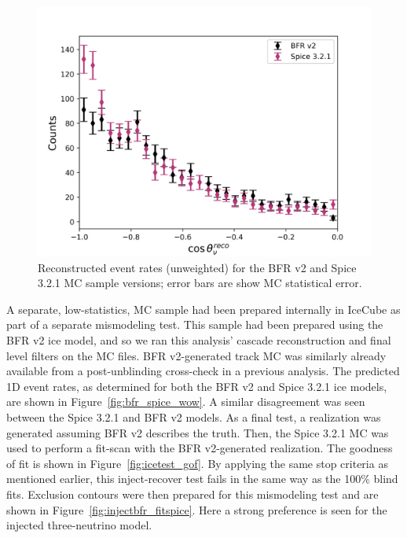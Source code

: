 \documentclass[main.tex]{subfiles}
\begin{document}
\begin{figure}
    \centering
    \includegraphics[width=0.8\linewidth]{figures/ice_investigate/icetest.png}
    \caption{Reconstructed event rates (unweighted) for the BFR v2 and Spice 3.2.1 MC sample versions; error bars are show MC statistical error.}\label{fig:icetest}
\end{figure}

A separate, low-statistics, MC sample had been prepared internally in IceCube as part of a separate mismodeling test. 
This sample had been prepared using the BFR v2 ice model, and so we ran this analysis' cascade reconstruction and final level filters on the MC files. 
BFR v2-generated track MC was similarly already available from a post-unblinding cross-check in a previous analysis.
The predicted 1D event rates, as determined for both the BFR v2 and Spice 3.2.1 ice models, are shown in Figure~\ref{fig:bfr_spice_wow}. 
A similar disagreement was seen between the Spice 3.2.1 and BFR v2 models.
As a final test, a realization was generated assuming BFR v2 describes the truth.
Then, the Spice 3.2.1 MC was used to perform a fit-scan with the BFR v2-generated realization. 
The goodness of fit is shown in Figure~\ref{fig:icetest_gof}.
By applying the same stop criteria as mentioned earlier, this inject-recover test fails in the same way as the 100\% blind fits. 
Exclusion contours were then prepared for this mismodeling test and are shown in Figure~\ref{fig:injectbfr_fitspice}.
Here a strong preference is seen for the injected three-neutrino model. 
\end{document}
